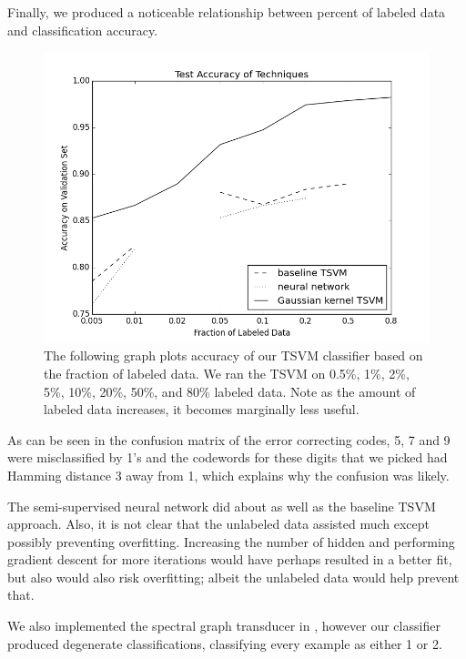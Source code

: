 \documentclass[11pt]{article}
\begin{document}
Finally, we produced a noticeable relationship between percent of labeled data and classification accuracy. \par

\begin{figure}
  \centering
  \caption{The following graph plots accuracy of our TSVM classifier based on the fraction of labeled data. We ran the TSVM on 0.5\%, 1\%, 2\%, 5\%, 10\%, 20\%, 50\%, and 80\% labeled data. Note as the amount of labeled data increases, it becomes marginally less useful.}
  \includegraphics[width=5in]{figure_1.png}
\end{figure}


As can be seen in the confusion matrix of the error correcting codes,
5, 7 and 9 were misclassified by 1's and the codewords for
these digits that we picked had Hamming distance 3 away from 1, which
explains why the confusion was likely.

The semi-supervised neural network did about as well as the baseline TSVM approach. Also, it is not clear that the unlabeled data assisted much except possibly preventing overfitting. Increasing the number of hidden and performing gradient descent for more iterations would have perhaps resulted in a better fit, but also would also risk overfitting; albeit the unlabeled data would help prevent that. 

We also implemented the spectral graph transducer in \cite{joachims2003transductive}, however our classifier
produced degenerate classifications, classifying every example as either 1 or 2.
\end{document}
